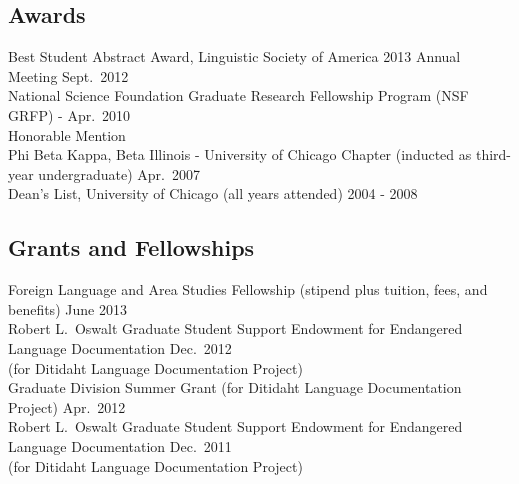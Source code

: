 \documentclass[11pt]{article}
\begin{document}

\subsection*{Awards}

Best Student Abstract Award, Linguistic Society of America 2013 Annual Meeting \hfill Sept.~2012\vspace{-8pt} \\

\noindent National Science Foundation Graduate Research Fellowship Program (NSF GRFP) - \hfill Apr.~2010 \\
\mbox{}\hspace{0.45in}Honorable Mention\vspace{-8pt} \\

\noindent Phi Beta Kappa, Beta Illinois - University of Chicago Chapter (inducted as third-year undergraduate) \hfill Apr.~2007\vspace{-8pt} \\

\noindent Dean's List, University of Chicago (all years attended) \hfill 2004 - 2008

\subsection*{Grants and Fellowships}

\noindent Foreign Language and Area Studies Fellowship (stipend plus tuition, fees, and benefits) \hfill June 2013\vspace{-8pt} \\

\noindent Robert L.~Oswalt Graduate Student Support Endowment for Endangered Language Documentation \hfill Dec.~2012 \\
\mbox{}\hspace{0.45in} (for Ditidaht Language Documentation Project)\vspace{-8pt} \\

\noindent Graduate Division Summer Grant (for Ditidaht Language Documentation Project) \hfill Apr.~2012\vspace{-8pt} \\

\noindent Robert L.~Oswalt Graduate Student Support Endowment for Endangered Language Documentation \hfill Dec.~2011 \\
\mbox{}\hspace{0.45in} (for Ditidaht Language Documentation Project)\vspace{-8pt} \\
\end{document}
